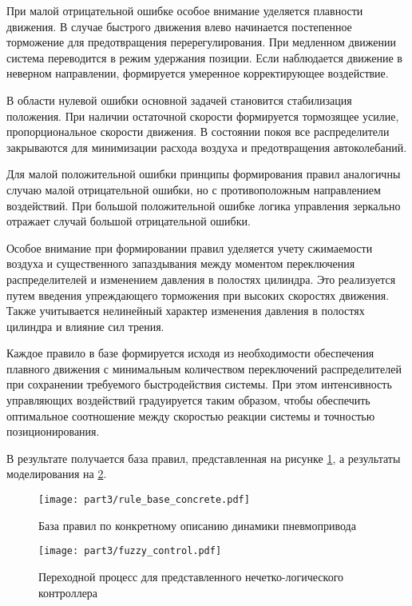 При малой отрицательной ошибке особое внимание уделяется
плавности движения. В случае быстрого движения влево начинается
постепенное торможение для предотвращения перерегулирования.
При медленном движении система переводится в режим удержания
позиции. Если наблюдается движение в неверном направлении,
формируется умеренное корректирующее воздействие.

В области нулевой ошибки основной задачей становится стабилизация
положения. При наличии остаточной скорости формируется тормозящее
усилие, пропорциональное скорости движения. В состоянии покоя все
распределители закрываются для минимизации расхода воздуха и
предотвращения автоколебаний.

Для малой положительной ошибки принципы формирования правил
аналогичны случаю малой отрицательной ошибки, но с противоположным
направлением воздействий. При большой положительной ошибке
логика управления зеркально отражает случай большой отрицательной ошибки.

Особое внимание при формировании правил уделяется учету сжимаемости
воздуха и существенного запаздывания между моментом переключения
распределителей и изменением давления в полостях цилиндра. Это
реализуется путем введения упреждающего торможения при высоких
скоростях движения. Также учитывается нелинейный характер изменения
давления в полостях цилиндра и влияние сил трения.

Каждое правило в базе формируется исходя из необходимости
обеспечения плавного движения с минимальным количеством
переключений распределителей при сохранении требуемого
быстродействия системы. При этом интенсивность управляющих
воздействий градуируется таким образом, чтобы обеспечить
оптимальное соотношение между скоростью реакции системы и
точностью позиционирования.

В результате получается база правил, представленная на рисунке \ref{fig:concrette_fuzzy_rules}, а результаты моделирования на \ref{fig:fuzzy_transient}.

\begin{figure}[ht]
	\centering
	\texttt{[image: part3/rule\_base\_concrete.pdf]}
	\caption{База правил по конкретному описанию динамики пневмопривода}
	\label{fig:concrette_fuzzy_rules}
\end{figure}

\begin{figure}[ht]
	\centering
	\texttt{[image: part3/fuzzy\_control.pdf]}
	\caption{Переходной процесс для представленного нечетко-логического контроллера }
	\label{fig:fuzzy_transient}
\end{figure}

